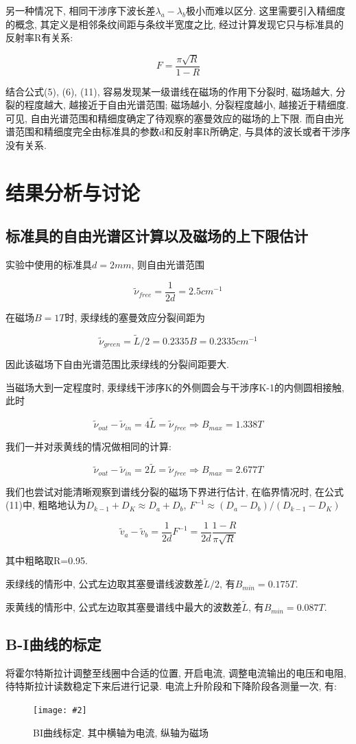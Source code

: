\documentclass[12pt,a4paper]{article}
\newcommand{\be}[1]{
    \begin{equation}
        #1
    \end{equation}
}
\newcommand{\bfig}[3]{
    \begin{figure}[H]
        \centering
        \texttt{[image: \#2]}
        \caption{#3}
    \end{figure}
}
\begin{document}
另一种情况下, 相同干涉序下波长差$\lambda_{a}-\lambda_{b}$极小而难以区分. 这里需要引入精细度的概念, 其定义是相邻条纹间距与条纹半宽度之比, 
经过计算发现它只与标准具的反射率R有关系: 
\be{F=\frac{\pi \sqrt{R}}{1-R}}

结合公式(5), (6), (11), 容易发现某一级谱线在磁场的作用下分裂时, 磁场越大, 分裂的程度越大, 越接近于自由光谱范围; 磁场越小, 分裂程度越小, 越接近于精细度. 
可见, 自由光谱范围和精细度确定了待观察的塞曼效应的磁场的上下限. 而自由光谱范围和精细度完全由标准具的参数d和反射率R所确定, 与具体的波长或者干涉序没有关系. 
\section{结果分析与讨论}
\subsection{标准具的自由光谱区计算以及磁场的上下限估计}
实验中使用的标准具$d=2mm$, 则自由光谱范围
\be{\widetilde{\nu}_{free}=\frac{1}{2d}=2.5 cm^{-1}}
在磁场$B=1T$时, 汞绿线的塞曼效应分裂间距为
\be{\widetilde{\nu}_{green}=\widetilde{L}/2=0.2335B=0.2335 cm^{-1}}
因此该磁场下自由光谱范围比汞绿线的分裂间距要大. 

当磁场大到一定程度时, 汞绿线干涉序K的外侧圆会与干涉序K-1的内侧圆相接触, 此时
\be{\widetilde{\nu}_{out}-\widetilde{\nu}_{in}=4\widetilde{L}=\widetilde{\nu}_{free} \Rightarrow B_{max}=1.338T}
我们一并对汞黄线的情况做相同的计算:
\be{\widetilde{\nu}_{out}-\widetilde{\nu}_{in}=2\widetilde{L}=\widetilde{\nu}_{free} \Rightarrow B_{max}=2.677T}

我们也尝试对能清晰观察到谱线分裂的磁场下界进行估计, 在临界情况时, 在公式(11)中, 粗略地认为$D_{k-1}+D_{K}\approx D_{a}+D_{b}$, $F^{-1}\approx(D_{a}-D_b)/(D_{k-1}-D_{K})$
\be{\widetilde{v}_{a}-\widetilde{v}_{b}=\frac{1}{2d}F^{-1}=\frac{1}{2d}\frac{1-R}{\pi \sqrt{R}}}
其中粗略取R=0.95. 

汞绿线的情形中, 公式左边取其塞曼谱线波数差$\widetilde{L}/2$, 有$B_{min}=0.175T$. 

汞黄线的情形中, 公式左边取其塞曼谱线中最大的波数差$\widetilde{L}$, 有$B_{min}=0.087T$. 

\subsection{B-I曲线的标定}
将霍尔特斯拉计调整至线圈中合适的位置, 开启电流, 调整电流输出的电压和电阻, 待特斯拉计读数稳定下来后进行记录. 电流上升阶段和下降阶段各测量一次, 有: 
\bfig{0.9}{BI曲线.png}{BI曲线标定. 其中横轴为电流, 纵轴为磁场}
\end{document}
